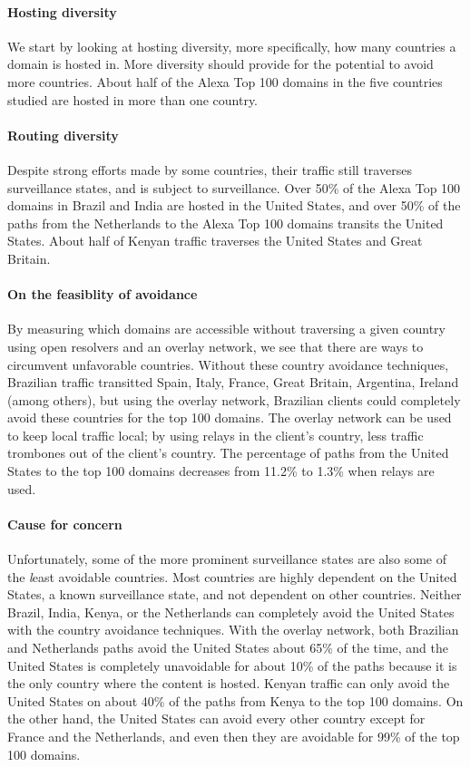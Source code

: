 \paragraph{Hosting diversity}
We start by looking at hosting diversity, more specifically, how many
countries a domain is hosted in.  More diversity should provide for the
potential to avoid more countries.  About half of the
Alexa Top 100 domains in the five countries studied are hosted in more
than one country. 

\paragraph{Routing diversity}
Despite strong efforts made by some countries,
their traffic still traverses surveillance states, and is
subject to surveillance.  Over 50\% of the Alexa Top 100 domains in
Brazil and India are hosted in the United States, and over 50\% of the
paths from the Netherlands to the Alexa Top 100 domains transits the
United States.  About half of Kenyan traffic traverses the United States
and Great Britain.   

\paragraph{On the feasiblity of avoidance}
By measuring which domains are accessible without traversing a given
country using open resolvers and an overlay network, we see that
there are ways to circumvent unfavorable countries.  Without these
country avoidance techniques, Brazilian traffic transitted Spain, Italy,
France, Great Britain, Argentina, Ireland (among others), but using the
overlay network, Brazilian clients could completely avoid these
countries for the top 100 domains.  The overlay network can be used to
keep local traffic local; by using relays in the client's country, less
traffic trombones out of the client's country.  The percentage of paths
from the United States to the top 100 domains decreases from 11.2\% to 1.3\% when
relays are used.   

\paragraph{Cause for concern}
Unfortunately, some of the more prominent surveillance states are also
some of the {\textit least avoidable} countries.  Most countries are
highly dependent on the United States, a known surveillance state, and
not dependent on other countries.  Neither Brazil, India, Kenya, or the
Netherlands can completely avoid the United States with the country
avoidance techniques.  With the overlay network, both Brazilian and
Netherlands paths avoid the United States about 65\% of the time, and
the United States is completely unavoidable for about 10\% of the paths
because it is the only country where the content is hosted.  Kenyan traffic can
only avoid the United States on about 40\% of the paths from Kenya to
the top 100 domains.  On the other hand, the United States can avoid
every other country except for France and the Netherlands, and even then
they are avoidable for 99\% of the top 100 domains. 

